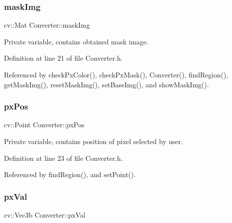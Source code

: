 \mbox{\label{class_converter_a242e40c925fedcc92959bc76d24c77d5}} 
\subsubsection{\texorpdfstring{maskImg}{maskImg}}
{\footnotesize\ttfamily cv\+::\+Mat Converter\+::mask\+Img\hspace{0.3cm}{\ttfamily [private]}}



Private variable, contains obtained mask image. 



Definition at line 21 of file Converter.\+h.



Referenced by check\+Px\+Color(), check\+Px\+Mask(), Converter(), find\+Region(), get\+Mask\+Img(), reset\+Mask\+Img(), set\+Base\+Img(), and show\+Mask\+Img().

\mbox{\label{class_converter_af5ef027f6fd12d21306f669275664497}} 
\subsubsection{\texorpdfstring{pxPos}{pxPos}}
{\footnotesize\ttfamily cv\+::\+Point Converter\+::px\+Pos\hspace{0.3cm}{\ttfamily [private]}}



Private variable, contains position of pixel selected by user. 



Definition at line 23 of file Converter.\+h.



Referenced by find\+Region(), and set\+Point().

\mbox{\label{class_converter_acf7b32e1932bc6c2bbbe7397c9f3e5c1}} 
\subsubsection{\texorpdfstring{pxVal}{pxVal}}
{\footnotesize\ttfamily cv\+::\+Vec3b Converter\+::px\+Val\hspace{0.3cm}{\ttfamily [private]}}



